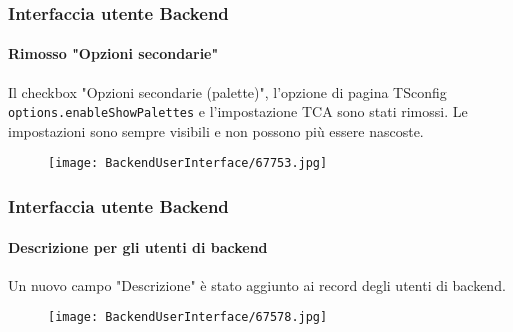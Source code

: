 \begin{frame}[fragile]
	\frametitle{Interfaccia utente Backend}
	\framesubtitle{Rimosso "Opzioni secondarie"}

	Il checkbox "Opzioni secondarie (palette)", l'opzione di pagina TSconfig \texttt{options.enableShowPalettes}
	e l'impostazione TCA sono stati rimossi. Le impostazioni sono sempre visibili e non possono più essere nascoste.

	\begin{figure}
		\texttt{[image: BackendUserInterface/67753.jpg]}
	\end{figure}

\end{frame}

\begin{frame}[fragile]
	\frametitle{Interfaccia utente Backend}
	\framesubtitle{Descrizione per gli utenti di backend}

	Un nuovo campo "Descrizione" è stato aggiunto ai record degli utenti di backend.

	\begin{figure}
		\texttt{[image: BackendUserInterface/67578.jpg]}
	\end{figure}

\end{frame}

